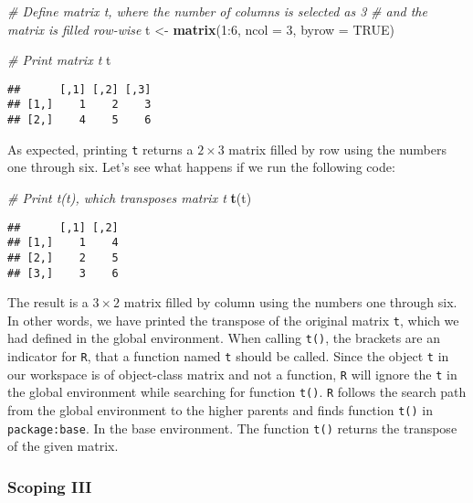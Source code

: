 \documentclass[11,]{article}
\newenvironment{Shaded}{\begin{snugshade}}{\end{snugshade}}
\newcommand{\KeywordTok}[1]{\textcolor[rgb]{0.13,0.29,0.53}{\textbf{{#1}}}}
\newcommand{\DataTypeTok}[1]{\textcolor[rgb]{0.13,0.29,0.53}{{#1}}}
\newcommand{\DecValTok}[1]{\textcolor[rgb]{0.00,0.00,0.81}{{#1}}}
\newcommand{\StringTok}[1]{\textcolor[rgb]{0.31,0.60,0.02}{{#1}}}
\newcommand{\CommentTok}[1]{\textcolor[rgb]{0.56,0.35,0.01}{\textit{{#1}}}}
\newcommand{\OtherTok}[1]{\textcolor[rgb]{0.56,0.35,0.01}{{#1}}}
\newcommand{\NormalTok}[1]{{#1}}
\begin{document}
\begin{Shaded}
\begin{Highlighting}[]
\CommentTok{# Define matrix t, where the number of columns is selected as 3}
\CommentTok{# and the matrix is filled row-wise}
\NormalTok{t <-}\StringTok{ }\KeywordTok{matrix}\NormalTok{(}\DecValTok{1}\NormalTok{:}\DecValTok{6}\NormalTok{, }\DataTypeTok{ncol =} \DecValTok{3}\NormalTok{, }\DataTypeTok{byrow =} \OtherTok{TRUE}\NormalTok{)}

\CommentTok{# Print matrix t}
\NormalTok{t}
\end{Highlighting}
\end{Shaded}

\begin{verbatim}
##      [,1] [,2] [,3]
## [1,]    1    2    3
## [2,]    4    5    6
\end{verbatim}

As expected, printing \texttt{t} returns a \(2\times3\) matrix filled by
row using the numbers one through six. Let's see what happens if we run
the following code:

\begin{Shaded}
\begin{Highlighting}[]
\CommentTok{# Print t(t), which transposes matrix t}
\KeywordTok{t}\NormalTok{(t)}
\end{Highlighting}
\end{Shaded}

\begin{verbatim}
##      [,1] [,2]
## [1,]    1    4
## [2,]    2    5
## [3,]    3    6
\end{verbatim}

The result is a \(3\times2\) matrix filled by column using the numbers
one through six. In other words, we have printed the transpose of the
original matrix \texttt{t}, which we had defined in the global
environment. When calling \texttt{t()}, the brackets are an indicator
for \texttt{R}, that a function named \texttt{t} should be called. Since
the object \texttt{t} in our workspace is of object-class matrix and not
a function, \texttt{R} will ignore the \texttt{t} in the global
environment while searching for function \texttt{t()}. \texttt{R}
follows the search path from the global environment to the higher
parents and finds function \texttt{t()} in \texttt{package:base}. In the
base environment. The function \texttt{t()} returns the transpose of the
given matrix.

\subsubsection{Scoping III}\label{scoping-iii}
\end{document}
